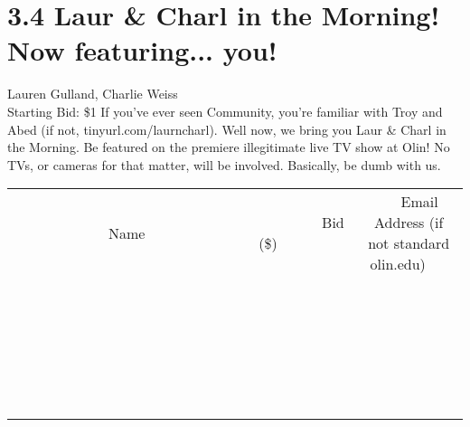 \documentclass[11pt]{article}
\begin{document}
\section*{3.4 Laur \& Charl in the Morning! Now featuring... you!}
Lauren Gulland, Charlie Weiss
\\
Starting Bid: \$1
\newline
If you've ever seen Community, you're familiar with Troy and Abed (if not, tinyurl.com/laurncharl). Well now, we bring you Laur \& Charl in the Morning. Be featured on the premiere illegitimate live TV show at Olin! No TVs, or cameras for that matter, will be involved. Basically, be dumb with us.
\\[6ex]
\begin{tabular}{c c c}
~~~~~~~~~~~~~Name~~~~~~~~~~~~~ & ~~~~~~~~~Bid (\$)~~~~~~~~~  & ~~~Email Address (if not standard olin.edu)~~~\\
 & & \\
\hline
 & & \\
\hline
 & & \\
\hline
 & & \\
\hline
 & & \\
\hline
 & & \\
\hline
 & & \\
\hline
 & & \\
\hline
 & & \\
\hline
 & & \\
\hline
 & & \\
\hline
 & & \\
\hline
 & & \\
\hline
 & & \\
\hline
 & & \\
\hline
 & & \\
\hline
 & & \\
\hline
 & & \\
\hline
 & & \\
\hline
 & & \\
\hline
 & & \\
\hline
 & & \\
\hline
 & & \\
\hline
 & & \\
\hline
 & & \\
\hline
 & & \\
\hline
\end{tabular}
\newpage
\end{document}
